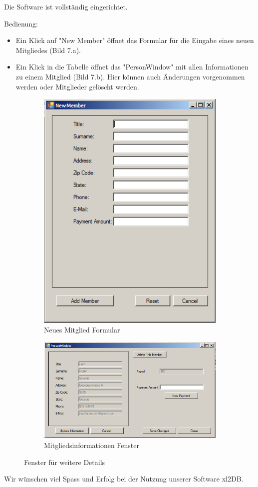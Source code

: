\documentclass{article}
\begin{document}
Die Software ist vollständig eingerichtet.

Bedienung: 
\begin{itemize}
\item Ein Klick auf "New Member" öffnet das Formular für die Eingabe eines neuen Mitgliedes (Bild 7.a).
 
\item Ein Klick in die Tabelle öffnet das "PersonWindow" mit allen Informationen zu einem Mitglied (Bild 7.b). Hier können auch Änderungen vorgenommen werden oder Mitglieder gelöscht werden.
\end{itemize}

 \begin{figure}[h]
 	\centering
 	\begin{subfigure}{.4\textwidth}
 		\centering
 		\includegraphics[width=.7\linewidth]{NewMemberGui}
 		\caption{Neues Mitglied Formular}
 		\label{fig:sub1}
 	\end{subfigure}%
 	\begin{subfigure}{.5\textwidth}
 		\centering
 		\includegraphics[width=.9\linewidth]{MemberInfoGUI}
 		\caption{Mitgliedsinformationen Fenster}
 		\label{fig:sub2}
 	\end{subfigure}
 	\caption{Fenster für weitere Details}
 	\label{fig:test}
 \end{figure}
 
 \centering \large Wir wünschen viel Spass und Erfolg bei der Nutzung unserer Software xl2DB. 
\end{document}
